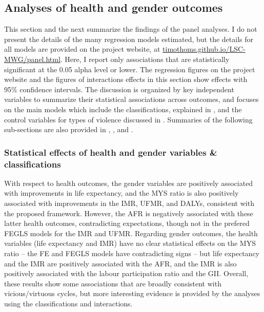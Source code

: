 \documentclass[12pt]{article}
\begin{document}

\subsection{Analyses of health and gender outcomes}
\label{results_hg}

This section and the next summarize the findings of the panel analyses.
I do not present the details of the many regression models estimated, but the details for all models are provided on the project website, at \href{https://timothoms.github.io/LSC-MWG/panel.html}{timothoms.github.io/LSC-MWG/panel.html}.
Here, I report only associations that are statistically significant at the 0.05 alpha level or lower. The regression figures on the project website and the figures of interactions effects in this section show effects with 95\% confidence intervals.
The discussion is organized by key independent variables to summarize their statistical associations across outcomes, and focuses on the main models which include the classifications, explained in , and the control variables for types of violence discussed in .
Summaries of the following sub-sections are also provided in , , and .



\subsubsection{Statistical effects of health and gender variables \& classifications}

With respect to health outcomes, the gender variables are positively associated with improvements in life expectancy, and the MYS ratio is also positively associated with improvements in the IMR, UFMR, and DALYs, consistent with the proposed framework.
However, the AFR is negatively associated with these latter health outcomes, contradicting expectations, though not in the prefered FEGLS models for the IMR and UFMR.
Regarding gender outcomes, the health variables (life expectancy and IMR) have no clear statistical effects on the MYS ratio -- the FE and FEGLS models have contradicting signs -- but life expectancy and the IMR are positively associated with the AFR, and the IMR is also positively associated with the labour participation ratio and the GII.
Overall, these results show some associations that are broadly consistent with vicious/virtuous cycles, but more interesting evidence is provided by the analyses using the classifications and interactions.
\end{document}
